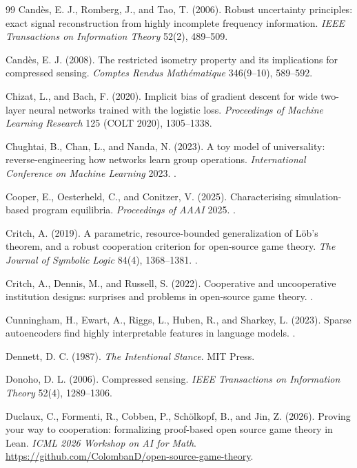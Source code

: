 \begin{thebibliography}{99}
 Cand\`es, E. J., Romberg, J., and Tao, T. (2006). Robust uncertainty principles: exact signal reconstruction from highly incomplete frequency information. \emph{IEEE Transactions on Information Theory} 52(2), 489--509.

 Cand\`es, E. J. (2008). The restricted isometry property and its implications for compressed sensing. \emph{Comptes Rendus Math\'ematique} 346(9--10), 589--592.




 Chizat, L., and Bach, F. (2020). Implicit bias of gradient descent for wide two-layer neural networks trained with the logistic loss. \emph{Proceedings of Machine Learning Research} 125 (COLT 2020), 1305--1338.

 Chughtai, B., Chan, L., and Nanda, N. (2023). A toy model of universality: reverse-engineering how networks learn group operations. \emph{International Conference on Machine Learning} 2023. .

 Cooper, E., Oesterheld, C., and Conitzer, V. (2025). Characterising simulation-based program equilibria. \emph{Proceedings of AAAI} 2025. .

 Critch, A. (2019). A parametric, resource-bounded generalization of L\"ob's theorem, and a robust cooperation criterion for open-source game theory. \emph{The Journal of Symbolic Logic} 84(4), 1368--1381. .

 Critch, A., Dennis, M., and Russell, S. (2022). Cooperative and uncooperative institution designs: surprises and problems in open-source game theory. .

 Cunningham, H., Ewart, A., Riggs, L., Huben, R., and Sharkey, L. (2023). Sparse autoencoders find highly interpretable features in language models. .


 Dennett, D. C. (1987). \emph{The Intentional Stance}. MIT Press.

 Donoho, D. L. (2006). Compressed sensing. \emph{IEEE Transactions on Information Theory} 52(4), 1289--1306.

 Duclaux, C., Formenti, R., Cobben, P., Sch\"olkopf, B., and Jin, Z. (2026). Proving your way to cooperation: formalizing proof-based open source game theory in Lean. \emph{ICML 2026 Workshop on AI for Math}. \url{https://github.com/ColombanD/open-source-game-theory}.


\end{thebibliography}
